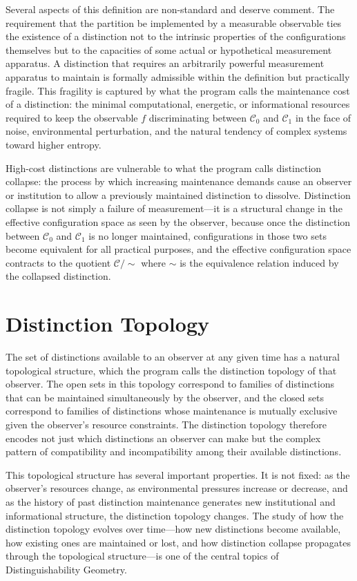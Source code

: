 \documentclass[11pt, oneside]{book}
\theoremstyle{definition}
\theoremstyle{remark}
\begin{document}
Several aspects of this definition are non-standard and deserve comment. The requirement that the partition be implemented by a measurable observable ties the existence of a distinction not to the intrinsic properties of the configurations themselves but to the capacities of some actual or hypothetical measurement apparatus. A distinction that requires an arbitrarily powerful measurement apparatus to maintain is formally admissible within the definition but practically fragile. This fragility is captured by what the program calls the maintenance cost of a distinction: the minimal computational, energetic, or informational resources required to keep the observable $f$ discriminating between $\mathcal{C}_0$ and $\mathcal{C}_1$ in the face of noise, environmental perturbation, and the natural tendency of complex systems toward higher entropy.

High-cost distinctions are vulnerable to what the program calls distinction collapse: the process by which increasing maintenance demands cause an observer or institution to allow a previously maintained distinction to dissolve. Distinction collapse is not simply a failure of measurement—it is a structural change in the effective configuration space as seen by the observer, because once the distinction between $\mathcal{C}_0$ and $\mathcal{C}_1$ is no longer maintained, configurations in those two sets become equivalent for all practical purposes, and the effective configuration space contracts to the quotient $\mathcal{C} / {\sim}$ where $\sim$ is the equivalence relation induced by the collapsed distinction.

\section{Distinction Topology}

The set of distinctions available to an observer at any given time has a natural topological structure, which the program calls the distinction topology of that observer. The open sets in this topology correspond to families of distinctions that can be maintained simultaneously by the observer, and the closed sets correspond to families of distinctions whose maintenance is mutually exclusive given the observer's resource constraints. The distinction topology therefore encodes not just which distinctions an observer can make but the complex pattern of compatibility and incompatibility among their available distinctions.

This topological structure has several important properties. It is not fixed: as the observer's resources change, as environmental pressures increase or decrease, and as the history of past distinction maintenance generates new institutional and informational structure, the distinction topology changes. The study of how the distinction topology evolves over time—how new distinctions become available, how existing ones are maintained or lost, and how distinction collapse propagates through the topological structure—is one of the central topics of Distinguishability Geometry.
\end{document}
